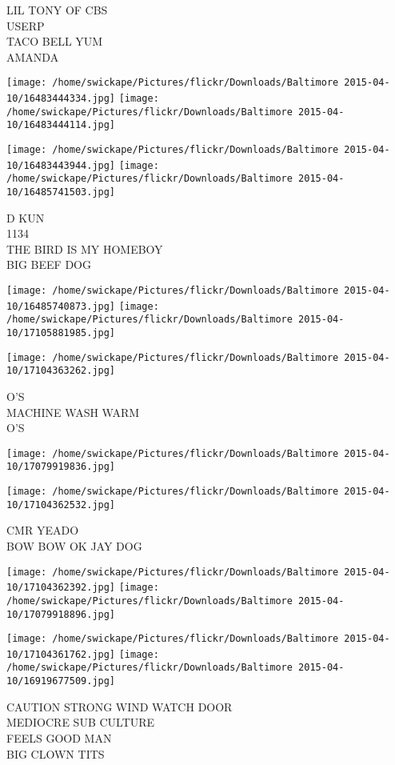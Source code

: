 \documentclass[10pt,letterpaper]{article}
\begin{document}
LIL TONY OF CBS\\
USERP\\
TACO BELL YUM\\
AMANDA
\pagebreak

\texttt{[image: /home/swickape/Pictures/flickr/Downloads/Baltimore 2015-04-10/16483444334.jpg]}
\texttt{[image: /home/swickape/Pictures/flickr/Downloads/Baltimore 2015-04-10/16483444114.jpg]}

\texttt{[image: /home/swickape/Pictures/flickr/Downloads/Baltimore 2015-04-10/16483443944.jpg]}
\texttt{[image: /home/swickape/Pictures/flickr/Downloads/Baltimore 2015-04-10/16485741503.jpg]}

D KUN\\
1134\\
THE BIRD IS MY HOMEBOY\\
BIG BEEF DOG
\pagebreak

\texttt{[image: /home/swickape/Pictures/flickr/Downloads/Baltimore 2015-04-10/16485740873.jpg]}
\texttt{[image: /home/swickape/Pictures/flickr/Downloads/Baltimore 2015-04-10/17105881985.jpg]}

\vspace{0.25in}
\texttt{[image: /home/swickape/Pictures/flickr/Downloads/Baltimore 2015-04-10/17104363262.jpg]}

O'S\\
MACHINE WASH WARM\\
O'S
\pagebreak

\texttt{[image: /home/swickape/Pictures/flickr/Downloads/Baltimore 2015-04-10/17079919836.jpg]}

\vspace{0.25in}
\texttt{[image: /home/swickape/Pictures/flickr/Downloads/Baltimore 2015-04-10/17104362532.jpg]}

CMR YEADO\\
BOW BOW OK JAY DOG
\pagebreak

\texttt{[image: /home/swickape/Pictures/flickr/Downloads/Baltimore 2015-04-10/17104362392.jpg]}
\texttt{[image: /home/swickape/Pictures/flickr/Downloads/Baltimore 2015-04-10/17079918896.jpg]}

\texttt{[image: /home/swickape/Pictures/flickr/Downloads/Baltimore 2015-04-10/17104361762.jpg]}
\texttt{[image: /home/swickape/Pictures/flickr/Downloads/Baltimore 2015-04-10/16919677509.jpg]}

CAUTION STRONG WIND WATCH DOOR\\
MEDIOCRE SUB CULTURE\\
FEELS GOOD MAN\\
BIG CLOWN TITS
\pagebreak
\end{document}
